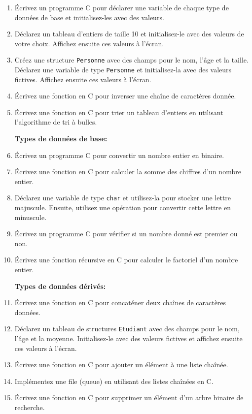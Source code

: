 \begin{enumerate}
	\item Écrivez un programme C pour déclarer une variable de chaque type de données de base et initialisez-les avec des valeurs.
	\item Déclarez un tableau d'entiers de taille 10 et initialisez-le avec des valeurs de votre choix. Affichez ensuite ces valeurs à l'écran.
	\item Créez une structure \texttt{Personne} avec des champs pour le nom, l'âge et la taille. Déclarez une variable de type \texttt{Personne} et initialisez-la avec des valeurs fictives. Affichez ensuite ces valeurs à l'écran.
	\item Écrivez une fonction en C pour inverser une chaîne de caractères donnée.
	\item Écrivez une fonction en C pour trier un tableau d'entiers en utilisant l'algorithme de tri à bulles.

\textbf{Types de données de base:}

	\item Écrivez un programme C pour convertir un nombre entier en binaire.
	\item Écrivez une fonction en C pour calculer la somme des chiffres d'un nombre entier.
	\item Déclarez une variable de type \texttt{char} et utilisez-la pour stocker une lettre majuscule. Ensuite, utilisez une opération pour convertir cette lettre en minuscule.
	\item Écrivez un programme C pour vérifier si un nombre donné est premier ou non.
	\item Écrivez une fonction récursive en C pour calculer le factoriel d'un nombre entier.

\textbf{Types de données dérivés:}

	\item Écrivez une fonction en C pour concaténer deux chaînes de caractères données.
	\item Déclarez un tableau de structures \texttt{Etudiant} avec des champs pour le nom, l'âge et la moyenne. Initialisez-le avec des valeurs fictives et affichez ensuite ces valeurs à l'écran.
	\item Écrivez une fonction en C pour ajouter un élément à une liste chaînée.
	\item Implémentez une file (queue) en utilisant des listes chaînées en C.
	\item Écrivez une fonction en C pour supprimer un élément d'un arbre binaire de recherche.


\end{enumerate}
